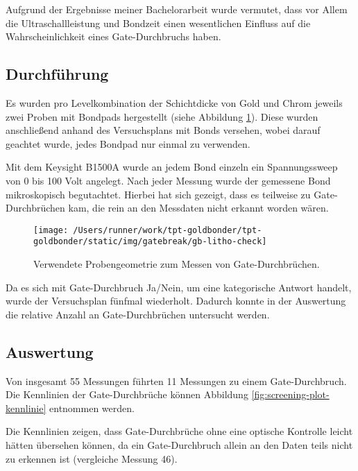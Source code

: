 \documentclass[
  paper=a4,
  ,captions=tableheading
]{scrartcl}
\begin{document}
Aufgrund der Ergebnisse meiner Bachelorarbeit wurde vermutet, dass vor Allem die Ultraschallleistung und Bondzeit einen wesentlichen Einfluss auf die Wahrscheinlichkeit eines Gate-Durchbruchs haben.

\hypertarget{durchfuxfchrung}{%
\subsection{Durchführung}\label{durchfuxfchrung}}

Es wurden pro Levelkombination der Schichtdicke von Gold und Chrom jeweils zwei Proben mit Bondpads hergestellt (siehe Abbildung \ref{fig:screening-litho}). Diese wurden anschließend anhand des Versuchsplans mit Bonds versehen, wobei darauf geachtet wurde, jedes Bondpad nur einmal zu verwenden.

Mit dem Keysight B1500A wurde an jedem Bond einzeln ein Spannungssweep von 0 bis 100 Volt angelegt. Nach jeder Messung wurde der gemessene Bond mikroskopisch begutachtet. Hierbei hat sich gezeigt, dass es teilweise zu Gate-Durchbrüchen kam, die rein an den Messdaten nicht erkannt worden wären.

\begin{figure}

{\centering \texttt{[image: /Users/runner/work/tpt-goldbonder/tpt-goldbonder/static/img/gatebreak/gb-litho-check]} 

}

\caption{Verwendete Probengeometrie zum Messen von Gate-Durchbrüchen.}\label{fig:screening-litho}
\end{figure}

Da es sich mit Gate-Durchbruch Ja/Nein, um eine kategorische Antwort handelt, wurde der Versuchsplan fünfmal wiederholt. Dadurch konnte in der Auswertung die relative Anzahl an Gate-Durchbrüchen untersucht werden.

\hypertarget{auswertung}{%
\subsection{Auswertung}\label{auswertung}}

Von insgesamt 55 Messungen führten 11 Messungen zu einem Gate-Durchbruch. Die Kennlinien der Gate-Durchbrüche können Abbildung \ref{fig:screening-plot-kennlinie} entnommen werden.

Die Kennlinien zeigen, dass Gate-Durchbrüche ohne eine optische Kontrolle leicht hätten übersehen können, da ein Gate-Durchbruch allein an den Daten teils nicht zu erkennen ist (vergleiche Messung 46).
\end{document}
